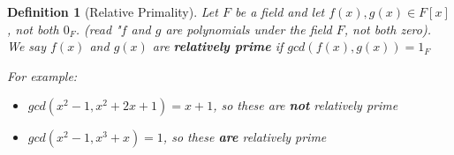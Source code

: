 \documentclass{article}
\theoremstyle{break}
\newtheorem{definition}{Definition}[subsection]
\begin{document}
\begin{definition}[Relative Primality]
  Let $F$ be a field and let $f(x), g(x) \in F[x]$, not both $0_F$. (read "$f$
  and $g$ are polynomials under the field $F$, not both zero). We say $f(x)$
  and $g(x)$ are \textbf{relatively prime} if $gcd(f(x), g(x)) = 1_F$

  For example:
  \begin{itemize}
    \item $gcd(x^2 - 1, x^2 + 2x + 1) = x + 1$, so these are \textbf{not}
    relatively prime 
    \item $gcd(x^2 - 1, x^3 + x) = 1$, so these \textbf{are} relatively prime
  \end{itemize}
\end{definition}

\end{document}
